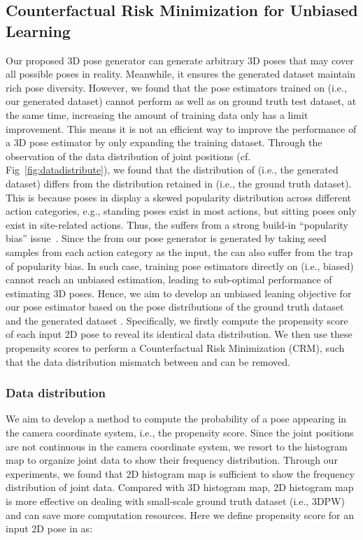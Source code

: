 \documentclass[runningheads]{llncs}
\begin{document}
\subsection{Counterfactual Risk Minimization for Unbiased Learning}
Our proposed 3D pose generator  can generate arbitrary 3D poses that may cover all possible poses in reality. Meanwhile, it ensures the generated dataset maintain rich pose diversity. 
However, we found that the pose estimators trained on  (i.e., our generated dataset) cannot perform as well as on ground truth test dataset, at the same time, increasing the amount of training data only has a limit improvement. 
This means it is not an efficient way to improve the performance of a 3D pose estimator by only expanding the training dataset. 
Through the observation of the data distribution of joint positions (cf. Fig~\ref{fig:datadistribute}), we found that the distribution of  (i.e., the generated dataset) differs from the distribution retained in  (i.e., the ground truth dataset). 
This is because poses in  display a skewed popularity distribution across different action categories, e.g., standing poses exist in most actions, but sitting poses only exist in site-related actions. 
Thus, the  suffers from a strong build-in ``popularity bias'' issue~\cite{Unbiasedtraining3}.
Since the  from our pose generator is generated by taking seed samples from each action category as the input, the  can also suffer from the trap of popularity bias.
In such case, training pose estimators directly on  (i.e., biased) cannot reach an unbiased estimation, leading to sub-optimal performance of estimating 3D poses. 
Hence, we aim to develop an unbiased leaning objective for our pose estimator based on the pose distributions of the ground truth dataset  and the generated dataset .
Specifically,  we firstly compute the propensity score of each input 2D pose  to reveal its identical data distribution. 
We then use these propensity scores to perform a Counterfactual Risk Minimization (CRM), such that the data distribution mismatch between  and  can be removed. 

\subsubsection{Data distribution} 
We aim to develop a method to compute the probability of a pose appearing in the camera coordinate system, i.e., the propensity score. 
Since the joint positions are not continuous in the camera coordinate system, we resort to the histogram map to organize joint data to show their frequency distribution. 
Through our experiments, we found that 2D histogram map is sufficient to show the frequency distribution of joint data. Compared with 3D histogram map, 2D histogram map is more effective on dealing with small-scale ground truth dataset (i.e., 3DPW) and can save more computation resources. 
Here we define propensity score  for an input 2D pose  in  as:
\end{document}
